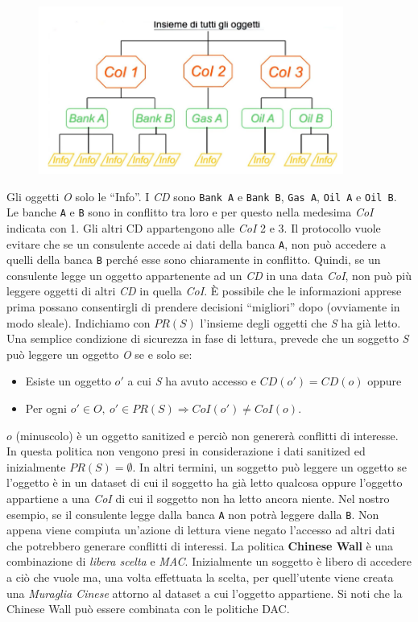 \begin{figure}[H]
      \centering
      \includegraphics[width=10cm, keepaspectratio]{capitoli/policy/imgs/chinese1.png}
\end{figure}

Gli oggetti \textit{O} solo le “Info”. I \textit{CD} sono \verb|Bank A|
e \verb|Bank B|, \verb|Gas A|, \verb|Oil A| e \verb|Oil B|.
Le banche \verb|A| e \verb|B| sono
in conflitto tra loro e per questo nella
medesima \textit{CoI} indicata con 1. Gli altri CD
appartengono alle \textit{CoI} 2 e 3.
Il protocollo vuole evitare che se un
consulente accede ai dati della banca \verb|A|, non
può accedere a quelli della banca \verb|B| perché
esse sono chiaramente in conflitto.
Quindi, se un consulente legge un oggetto appartenente ad un \textit{CD} in una
data \textit{CoI}, non può più
leggere oggetti di altri \textit{CD} in quella \textit{CoI}.
È possibile che le informazioni apprese prima possano consentirgli di prendere
decisioni “migliori” dopo (ovviamente in modo sleale).
Indichiamo con \(PR(S)\) l'insieme degli oggetti che \textit{S} ha già letto.
Una semplice condizione di sicurezza in fase di lettura, prevede che un soggetto
\textit{S} può leggere un
oggetto \textit{O} se e solo se:

\begin{itemize}
      \item Esiste un oggetto \(o'\) a cui \textit{S} ha avuto accesso e
            \(CD(o') = CD(o)\) oppure
      \item Per ogni \(o' \in O, \ o' \in PR(S) \Rightarrow CoI(o') \neq CoI(o)\).
\end{itemize}

\(o\) (minuscolo) è un oggetto sanitized e perciò non genererà conflitti di
interesse.
In questa politica non vengono presi in considerazione i dati sanitized ed
inizialmente \(PR(S) = \emptyset \).
In altri termini, un soggetto può leggere un oggetto se l'oggetto è in un dataset
di cui il soggetto ha
già letto qualcosa oppure l'oggetto appartiene a una \textit{CoI} di cui il
soggetto non ha letto ancora niente. Nel nostro esempio, se il consulente legge
dalla banca \verb|A| non potrà leggere dalla \verb|B|. Non
appena viene compiuta un'azione di lettura viene negato l'accesso ad altri dati
che potrebbero generare conflitti di interessi.
La politica \textbf{Chinese Wall} è una combinazione di \textit{libera scelta} e
\textit{MAC}. Inizialmente un soggetto è
libero di accedere a ciò che vuole ma, una volta effettuata la scelta, per
quell'utente viene creata una \textit{Muraglia Cinese} attorno al dataset a cui
l'oggetto appartiene.
Si noti che la Chinese Wall può essere combinata con le politiche DAC.

